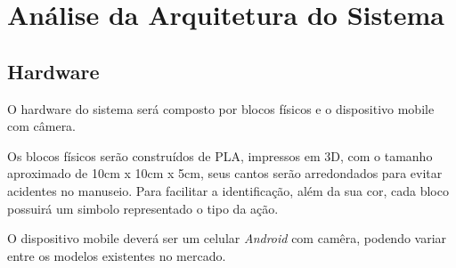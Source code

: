 

    
    
    
    
    


\section{Análise da Arquitetura do Sistema}

    \subsection{Hardware}
    O hardware do sistema será composto por blocos físicos e o dispositivo mobile com câmera.
    
    Os blocos físicos serão construídos de PLA, impressos em 3D, com o tamanho aproximado de 10cm x 10cm x 5cm, seus cantos serão arredondados para evitar acidentes no manuseio. Para facilitar a identificação, além da sua cor, cada bloco possuirá um simbolo representado o tipo da ação.
    
    O dispositivo mobile deverá ser um celular \textit{Android} com camêra, podendo variar entre os modelos existentes no mercado.
    

